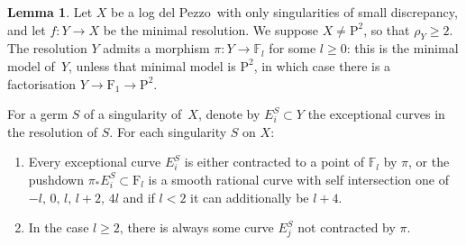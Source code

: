 \documentclass[11pt]{amsbook}
\theoremstyle{definition}
\theoremstyle{definition}
\theoremstyle{definition}
\theoremstyle{definition}
\theoremstyle{definition}
\newtheorem{lem}[thm]{Lemma}
\theoremstyle{definition}
\theoremstyle{definition}
\theoremstyle{definition}
\newcommand{\ldp}{log del Pezzo}
\newcommand{\mb}[1]{\mathbb{#1}}
\newcommand{\minres}{minimal resolution}
\newcommand{\F}{\mathrm{F}}
\renewcommand{\P}{\mathrm{P}}
\begin{document}
\begin{lem}\label{HSlem}
Let $X$ be a \ldp\ with only singularities of small discrepancy, and
let $f \colon Y \rightarrow X$ be the \minres. We suppose $X\not=\P^2$, so that $\rho_Y\ge2$.
The resolution $Y$ admits a morphism $\pi \colon Y \rightarrow \mathbb{F}_l$ for some $l\ge0$:
this is the minimal model of~$Y$, unless that minimal model
is $\P^2$, in which case there is a factorisation
$Y\rightarrow \F_1\rightarrow\P^2$.

For a germ $S$ of a singularity of~$X$, denote by
$E_i^S \subset Y$ the exceptional curves in the resolution of $S$.
For each singularity $S$ on $X$:
\begin{enumerate}
\item
Every exceptional curve $E_i^S$ is either contracted to a point of $\mb{F}_l$ by $\pi$,
or the pushdown
$\pi_* E_i^S\subset\F_l$ is a smooth rational curve with self intersection one of $-l, \,0, \, l, \, l+2, \, 4l $ and if $l<2$ it can additionally be $l+4$.
\item
In the case $l\ge2$, there is always some curve $E_j^S$ not contracted by $\pi$.
\end{enumerate}

\end{lem}
\end{document}
